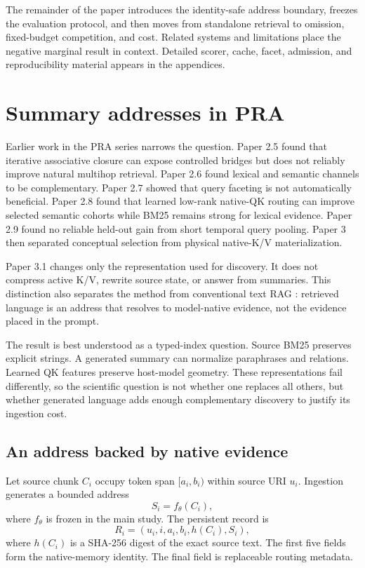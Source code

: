\documentclass[11pt]{article}
\newcommand{\pra}{\textsc{PRA}\xspace}
\newcommand{\kv}{K/V\xspace}
\begin{document}
The remainder of the paper introduces the identity-safe address boundary,
freezes the evaluation protocol, and then moves from standalone retrieval to
omission, fixed-budget competition, and cost. Related systems and limitations
place the negative marginal result in context. Detailed scorer, cache, facet,
admission, and reproducibility material appears in the appendices.

\section{Summary addresses in PRA}

Earlier work in the \pra series narrows the question. Paper 2.5 found that iterative associative closure can expose controlled bridges but does not reliably improve natural multihop retrieval. Paper 2.6 found lexical and semantic channels to be complementary. Paper 2.7 showed that query faceting is not automatically beneficial. Paper 2.8 found that learned low-rank native-QK routing can improve selected semantic cohorts while BM25 remains strong for lexical evidence. Paper 2.9 found no reliable held-out gain from short temporal query pooling. Paper 3 then separated conceptual selection from physical native-\kv materialization.

Paper 3.1 changes only the representation used for discovery. It does not
compress active \kv, rewrite source state, or answer from summaries. This
distinction also separates the method from conventional text RAG
\cite{lewis2020rag}: retrieved language is an address that resolves to
model-native evidence, not the evidence placed in the prompt.

The result is best understood as a typed-index question. Source BM25 preserves explicit strings. A generated summary can normalize paraphrases and relations. Learned QK features preserve host-model geometry. These representations fail differently, so the scientific question is not whether one replaces all others, but whether generated language adds enough complementary discovery to justify its ingestion cost.

\subsection{An address backed by native evidence}

Let source chunk $C_i$ occupy token span $[a_i,b_i)$ within source URI $u_i$. Ingestion generates a bounded address
\[
S_i=f_\theta(C_i),
\]
where $f_\theta$ is frozen in the main study. The persistent record is
\[
R_i=(u_i, i, a_i,b_i,h(C_i),S_i),
\]
where $h(C_i)$ is a SHA-256 digest of the exact source text. The first five fields form the native-memory identity. The final field is replaceable routing metadata.
\end{document}
